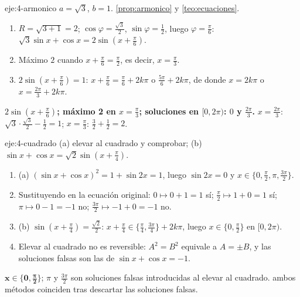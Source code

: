 \begin{solucion}{eje:4-armonico}
\datos $a=\sqrt3$, $b=1$.
\planteamiento \cref{prop:armonico} y \cref{teo:ecuaciones}.
\pasos
\begin{enumerate}[label=\arabic*.]
  \item $R=\sqrt{3+1}=2$; $\cos\varphi=\frac{\sqrt3}{2}$, $\sin\varphi=\frac12$, luego $\varphi=\frac{\pi}{6}$: $\sqrt3\sin x+\cos x=2\sin(x+\frac{\pi}{6})$.
  \item Máximo $2$ cuando $x+\frac{\pi}{6}=\frac{\pi}{2}$, es decir, $x=\frac{\pi}{3}$.
  \item $2\sin(x+\frac{\pi}{6})=1$: $x+\frac{\pi}{6}=\frac{\pi}{6}+2k\pi$ o $\frac{5\pi}{6}+2k\pi$, de donde $x=2k\pi$ o $x=\frac{2\pi}{3}+2k\pi$.
\end{enumerate}
\resultado \textbf{$2\sin(x+\frac{\pi}{6})$; máximo 2 en $x=\frac{\pi}{3}$; soluciones en $[0,2\pi)$: $0$ y $\frac{2\pi}{3}$.}
\comprobacion $x=\frac{2\pi}{3}$: $\sqrt3\cdot\frac{\sqrt3}{2}-\frac12=1$; $x=\frac{\pi}{3}$: $\frac32+\frac12=2$.
\end{solucion}

\begin{solucion}{eje:4-cuadrado}
\planteamiento (a) elevar al cuadrado y comprobar; (b) $\sin x+\cos x=\sqrt2\sin(x+\frac{\pi}{4})$.
\pasos
\begin{enumerate}[label=\arabic*.]
  \item (a) $(\sin x+\cos x)^{2}=1+\sin2x=1$, luego $\sin2x=0$ y $x\in\{0,\frac{\pi}{2},\pi,\frac{3\pi}{2}\}$.
  \item Sustituyendo en la ecuación original: $0\mapsto0+1=1$ sí; $\frac{\pi}{2}\mapsto1+0=1$ sí; $\pi\mapsto0-1=-1$ no; $\frac{3\pi}{2}\mapsto-1+0=-1$ no.
  \item (b) $\sin(x+\frac{\pi}{4})=\frac{\sqrt2}{2}$: $x+\frac{\pi}{4}\in\{\frac{\pi}{4},\frac{3\pi}{4}\}+2k\pi$, luego $x\in\{0,\frac{\pi}{2}\}$ en $[0,2\pi)$.
  \item Elevar al cuadrado no es reversible: $A^{2}=B^{2}$ equivale a $A=\pm B$, y las soluciones falsas son las de $\sin x+\cos x=-1$.
\end{enumerate}
\resultado $\mathbf{x\in\{0,\frac{\pi}{2}\}}$; $\pi$ y $\frac{3\pi}{2}$ son soluciones falsas introducidas al elevar al cuadrado.
\comprobacion ambos métodos coinciden tras descartar las soluciones falsas.
\end{solucion}

